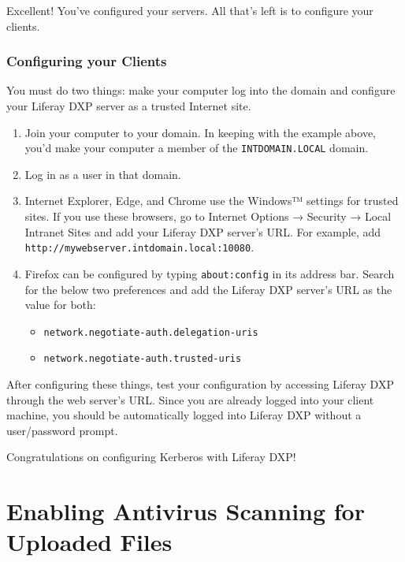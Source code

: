 Excellent! You've configured your servers. All that's left is to
configure your clients.

\subsection{Configuring your Clients}\label{configuring-your-clients}

You must do two things: make your computer log into the domain and
configure your Liferay DXP server as a trusted Internet site.

\begin{enumerate}
\def\labelenumi{\arabic{enumi}.}
\item
  Join your computer to your domain. In keeping with the example above,
  you'd make your computer a member of the \texttt{INTDOMAIN.LOCAL}
  domain.
\item
  Log in as a user in that domain.
\item
  Internet Explorer, Edge, and Chrome use the Windows™ settings for
  trusted sites. If you use these browsers, go to Internet Options →
  Security → Local Intranet Sites and add your Liferay DXP server's URL.
  For example, add \texttt{http://mywebserver.intdomain.local:10080}.
\item
  Firefox can be configured by typing \texttt{about:config} in its
  address bar. Search for the below two preferences and add the Liferay
  DXP server's URL as the value for both:

  \begin{itemize}
  \tightlist
  \item
    \texttt{network.negotiate-auth.delegation-uris}
  \item
    \texttt{network.negotiate-auth.trusted-uris}
  \end{itemize}
\end{enumerate}

After configuring these things, test your configuration by accessing
Liferay DXP through the web server's URL. Since you are already logged
into your client machine, you should be automatically logged into
Liferay DXP without a user/password prompt.

Congratulations on configuring Kerberos with Liferay DXP!

\chapter{Enabling Antivirus Scanning for Uploaded
Files}\label{enabling-antivirus-scanning-for-uploaded-files}


